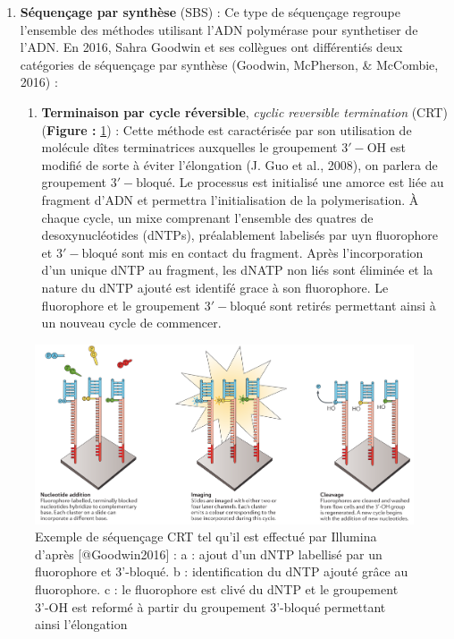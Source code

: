 \documentclass[12pt,twoside]{reedthesis}
\providecommand{\tightlist}{%
  \setlength{\itemsep}{0pt}\setlength{\parskip}{0pt}}
\theoremstyle{definition}
\theoremstyle{definition}
\theoremstyle{remark}
\begin{document}
  \begin{enumerate}
  \def\labelenumi{\arabic{enumi}.}
  \tightlist
  \item
    \textbf{Séquençage par synthèse} (SBS) : Ce type de séquençage
    regroupe l'ensemble des méthodes utilisant l'ADN polymérase pour
    synthetiser de l'ADN. En 2016, Sahra Goodwin et ses collègues ont
    différentiés deux catégories de séquençage par synthèse (Goodwin,
    McPherson, \& McCombie, 2016) :
  
    \begin{enumerate}
    \def\labelenumii{\alph{enumii}.}
    \tightlist
    \item
      \textbf{Terminaison par cycle réversible}, \emph{cyclic reversible
      termination} (CRT) (\textbf{Figure : }\ref{fig:crtSeq}) : Cette
      méthode est caractérisée par son utilisation de molécule dîtes
      terminatrices auxquelles le groupement \(\mathrm{3'-OH}\) est
      modifié de sorte à éviter l'élongation (J. Guo et al., 2008), on
      parlera de groupement \(\mathrm{3'-bloqué}\). Le processus est
      initialisé une amorce est liée au fragment d'ADN et permettra
      l'initialisation de la polymerisation. À chaque cycle, un mixe
      comprenant l'ensemble des quatres de desoxynucléotides (dNTPs),
      préalablement labelisés par uyn fluorophore et
      \(\mathrm{3'-bloqué}\) sont mis en contact du fragment. Après
      l'incorporation d'un unique dNTP au fragment, les dNATP non liés
      sont éliminée et la nature du dNTP ajouté est identifé grace à son
      fluorophore. Le fluorophore et le groupement \(\mathrm{3'-bloqué}\)
      sont retirés permettant ainsi à un nouveau cycle de commencer.
    \end{enumerate}
  \end{enumerate}
  
  \begin{figure}
  
  {\centering \includegraphics[scale=.28]{figure/CRT_seq_illumina} 
  
  }
  
  \caption[Exemple de séquençage CRT tel qu'il est effectué par Illumina]{Exemple de séquençage CRT tel qu'il est effectué par Illumina d'après [@Goodwin2016] : a : ajout d'un dNTP labellisé par un fluorophore et 3'-bloqué. b : identification du dNTP ajouté grâce au fluorophore. c : le fluorophore est clivé du dNTP et le groupement 3'-OH est reformé à partir du groupement 3'-bloqué permettant ainsi l'élongation}\label{fig:crtSeq}
  \end{figure}
  
\end{document}
